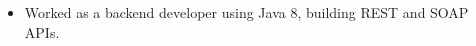 \documentclass[letterpaper]{twentysecondcv} %
\begin{document}
\begin{twentyla}
{        \begin{itemize}
            \item Worked as a backend developer using Java 8, building REST and SOAP APIs.
          \end{itemize}
    }
    \\


\end{twentyla}
\end{document}
